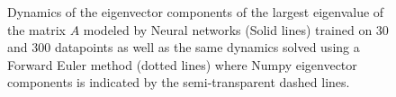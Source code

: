 \documentclass[reprint, english, nofootinbib]{revtex4-2}
\begin{document}
\begin{figure}[h!tb]
   \center
   \caption{\label{fig:eigenvector} Dynamics of the eigenvector components of the largest eigenvalue of the matrix $A$ modeled by Neural networks (Solid lines) trained on 30 and 300 datapoints as well as the same dynamics solved using a Forward Euler method (dotted lines) where Numpy eigenvector components is indicated by the semi-transparent dashed lines.}
\end{figure}
\end{document}
